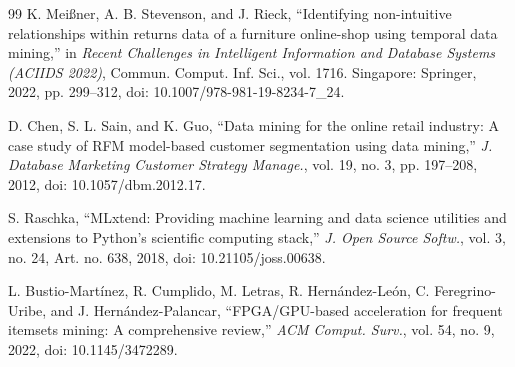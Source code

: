 \documentclass[11pt,a4paper]{article}
\begin{document}
\begin{thebibliography}{99}
K. Mei{\ss}ner, A. B. Stevenson, and J. Rieck, ``Identifying non-intuitive relationships within returns data of a furniture online-shop using temporal data mining,'' in \emph{Recent Challenges in Intelligent Information and Database Systems (ACIIDS 2022)}, Commun. Comput. Inf. Sci., vol. 1716. Singapore: Springer, 2022, pp. 299--312, doi: 10.1007/978-981-19-8234-7\_24.

D. Chen, S. L. Sain, and K. Guo, ``Data mining for the online retail industry: A case study of RFM model-based customer segmentation using data mining,'' \emph{J. Database Marketing Customer Strategy Manage.}, vol. 19, no. 3, pp. 197--208, 2012, doi: 10.1057/dbm.2012.17.

S. Raschka, ``MLxtend: Providing machine learning and data science utilities and extensions to Python's scientific computing stack,'' \emph{J. Open Source Softw.}, vol. 3, no. 24, Art. no. 638, 2018, doi: 10.21105/joss.00638.

L. Bustio-Mart{\'i}nez, R. Cumplido, M. Letras, R. Hern{\'a}ndez-Le{\'o}n, C. Feregrino-Uribe, and J. Hern{\'a}ndez-Palancar, ``FPGA/GPU-based acceleration for frequent itemsets mining: A comprehensive review,'' \emph{ACM Comput. Surv.}, vol. 54, no. 9, 2022, doi: 10.1145/3472289.

\end{thebibliography}
\end{document}
